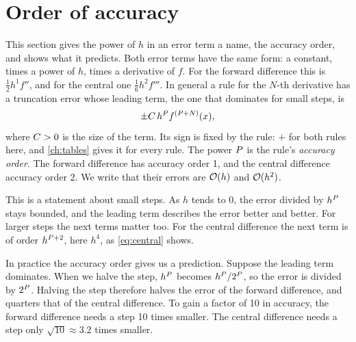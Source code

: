\section{Order of accuracy}\label{sec:taylor-order}

This section gives the power of $h$ in an error term a name, the accuracy order, and shows what it predicts. Both
error terms have the same form: a constant, times a power of $h$, times a derivative of $f$. For the forward
difference this is $\frac{1}{2} h^1 f''$, and for the central one $\frac{1}{6} h^2 f'''$. In general a rule for the
$N$-th derivative has a truncation error whose leading term, the one that dominates for small steps, is
\begin{equation*}
  \pm C\, h^{P} f^{(P + N)}(x),
\end{equation*}
where $C > 0$ is the size of the term. Its sign is fixed by the rule: $+$ for both rules here, and
\cref{ch:tables} gives it for every rule. The power $P$ is the rule's \emph{accuracy order}. The forward difference has accuracy order 1, and the central difference accuracy order 2. We
write that their errors are $\mathcal{O}(h)$ and $\mathcal{O}(h^2)$.

This is a statement about small steps. As $h$ tends to 0, the error divided by $h^{P}$ stays bounded, and the
leading term describes the error better and better. For larger steps the next terms matter too. For the central
difference the next term is of order $h^{P + 2}$, here $h^4$, as \cref{eq:central} shows.

In practice the accuracy order gives us a prediction. Suppose the leading term dominates. When we halve the step,
$h^{P}$ becomes $h^{P} / 2^{P}$, so the error is divided by $2^{P}$. Halving the step
therefore halves the error of the forward difference, and quarters that of the central difference. To gain a factor
of 10 in accuracy, the forward difference needs a step 10 times smaller. The central difference needs a step only
$\sqrt{10} \approx 3.2$ times smaller.

\begin{figure}[t]
\centering

\end{figure}

